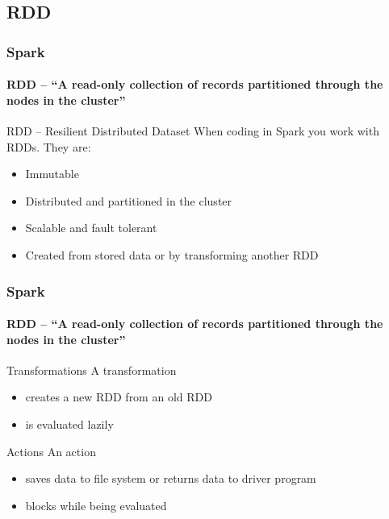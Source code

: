 \documentclass[aspectratio=169,usenames,dvipsnames]{beamer}
\begin{document}
    \subsection{RDD}
        \begin{frame}
            \frametitle{Spark}
            \framesubtitle{RDD -- ``A read-only collection of records partitioned through the nodes in the cluster''}
            \begin{block}{RDD -- Resilient Distributed Dataset}
                When coding in Spark you work with RDDs. They are:
                \begin{itemize}
                    \item Immutable 
                    \item Distributed and partitioned in the cluster
                    \item Scalable and fault tolerant
                    \item Created from stored data or by transforming another RDD
                \end{itemize}
            \end{block}
        \end{frame}
        
        \begin{frame}
            \frametitle{Spark}
            \framesubtitle{RDD -- ``A read-only collection of records partitioned through the nodes in the cluster''}
            \begin{block}{Transformations}
                A transformation 
                \begin{itemize}
                    \item creates a \alert{new RDD} from an old RDD
                    \item is evaluated \alert{lazily}
                \end{itemize}
            \end{block}
            \begin{block}{Actions}
                An action 
                \begin{itemize}
                    \item \alert{saves data} to file system or \alert{returns data} to driver program
                    \item \alert{blocks} while being evaluated
                \end{itemize}
            \end{block}
        \end{frame}
\end{document}
